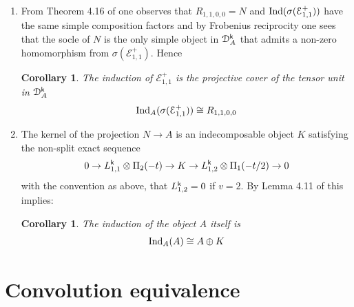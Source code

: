 \documentclass[a4paper, reqno]{amsart}
\newtheorem{corollary}[theorem]{Corollary}
\theoremstyle{introTheorems}
\newcommand\cD{\mathcal{D}}
\newcommand\cE{\mathcal{E}}
\newcommand{\Ind}{\textup{Ind}}
\renewcommand{\1}{\mathbbold{1}}
\begin{document}
\begin{enumerate}
\[\begin{cases}
\mathbb C & X \cong \VirPhi_{1,1} \otimes \Pi_{-2}(t) \ \text{and} \ v = 2 \\ 
0 & \ \text{otherwise} 
\end{cases}
\]
\item From Theorem 4.16 of \cite{CMY1} one observes that $R_{1, 1, 0, 0}=N$ and $\Ind(\sigma(\cE_{1,1}^+))$ have the same simple composition factors and by Frobenius reciprocity one sees that the socle of $N$ is the only simple object in $\cD^\k_A$ 
that admits a non-zero homomorphism from $\sigma(\cE_{1,1}^+)$. Hence 
\begin{corollary}\label{cor:InductionLieDual}
 The induction of $\cE_{1,1}^+$ is the projective cover of the tensor unit in $\cD^\k_A$
 $$\Ind_A(\sigma(\cE_{1,1}^+))\cong R_{1, 1, 0, 0}$$
\end{corollary}

\item The kernel of the projection $N \rightarrow A$ is an indecomposable object $K$ satisfying the non-split exact sequence
\[
0 \rightarrow L^{\mathsf{k}}_{1, 1} \otimes \Pi_2(-t) \rightarrow  K \rightarrow L^{\mathsf{k}}_{1, 2} \otimes \Pi_1(- t/2) \rightarrow 0
\]
with the convention as above, that $L^{\mathsf{k}}_{1, 2}=0$ if $v =2$.
By Lemma 4.11 of \cite{CMY1} this implies:
\begin{corollary}\label{cor:InductionA}
 The induction of the object $A$ itself is
 $$\Ind_A(A)\cong A\oplus K$$
\end{corollary}
\end{enumerate}




\section{Convolution equivalence}\label{sec:convolution}
\end{document}
